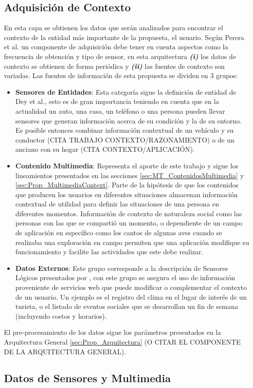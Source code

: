 \subsection{Adquisición de Contexto}
\label{subsec:Prop_Adquisicion}

En esta capa se obtienen los datos que serán analizados para encontrar el contexto de la entidad más importante de la propuesta, el usuario. Según Perera et al.\cite{Perera2014} un componente de adquisición debe tener en cuenta aspectos como la frecuencia de obtención y tipo de sensor, en esta arquitectura \textbf{\textit{(i)}} los datos de contexto se obtienen de forma periódica y \textbf{\textit{(ii)}} las fuentes de contexto son variadas. Las fuentes de información de esta propuesta se dividen en 3 grupos:
\begin{itemize}
    \item \textbf{Sensores de Entidades}: Esta categoría sigue la definición de entidad de Dey et al.\cite{Dey2001}, esto es de gran importancia teniendo en cuenta que en la actualidad un auto, una casa, un teléfono o una persona pueden llevar sensores que generan información acerca de su condición y la de su entorno. Es posible entonces combinar información contextual de un vehículo y su conductor (CITA TRABAJO CONTEXTO/RAZONAMIENTO) o de un anciano con su hogar (CITA CONTEXTO/APLICACIÓN).
    \item \textbf{Contenido Multimedia}: Representa el aporte de este trabajo y sigue los lineamientos presentados en las secciones \ref{sec:MT_ContenidosMultimedia} y \ref{sec:Prop_MultimediaContext}. Parte de la hipótesis de que los contenidos que producen los usuarios en diferentes situaciones almacenan información contextual de utilidad para definir las situaciones de una persona en diferentes momentos. Información de contexto de naturaleza social como las personas con las que se compartió un momento, o dependiente de un campo de aplicación en específico como los cantos de algunas aves cuando se realizaba una exploración en campo permiten que una aplicación modifique su funcionamiento y facilite las actividades que este debe realizar.
    \item \textbf{Datos Externos}: Este grupo corresponde a la descripción de Sensores Lógicos presentados por \cite{Perera2014}, con este grupo se asegura el uso de información proveniente de servicios web que puede modificar o complementar el contexto de un usuario. Un ejemplo es el registro del clima en el lugar de interés de un turista, o el listado de eventos sociales que se desarrollan un fin de semana (incluyendo costos y horarios).
\end{itemize}

El pre-procesamiento de los datos sigue los parámetros presentados en la Arquitectura General \ref{sec:Prop_Arquitectura} (O CITAR EL COMPONENTE DE LA ARQUITECTURA GENERAL).

\subsection{Datos de Sensores y Multimedia}
\label{subsubsec:Prop_Adqui_Datos}